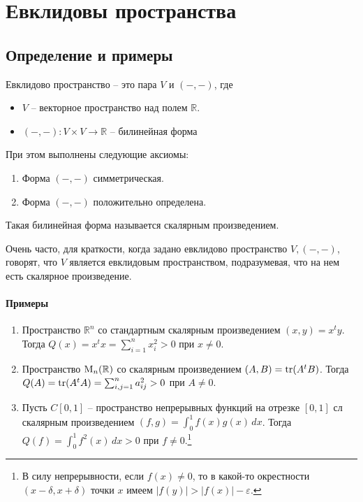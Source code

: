 \newpage
\section{Евклидовы пространства}

\subsection{Определение и примеры}

\begin{definition}
Евклидово пространство -- это пара $V$ и $({-},{-})$, где 
\begin{itemize}
\item $V$ -- векторное пространство над полем $\mathbb R$.
\item $({-},{-})\colon V\times V\to \mathbb R$ -- билинейная форма
\end{itemize}
При этом выполнены следующие аксиомы:
\begin{enumerate}
\item Форма $({-},{-})$ симметрическая.
\item Форма $({-},{-})$ положительно определена.
\end{enumerate}
Такая билинейная форма называется скалярным произведением.
\end{definition}

Очень часто, для краткости, когда задано евклидово пространство $V, ({-},{-})$, говорят, что $V$ является евклидовым пространством, подразумевая, что на нем есть скалярное произведение.

\paragraph{Примеры}
\begin{enumerate}
\item Пространство $\mathbb R^n$ со стандартным скалярным произведением $(x,y) = x^t y$. Тогда $Q(x) = x^t x = \sum_{i=1}^n x_i^2 > 0$ при $x\neq 0$.

\item Пространство $\operatorname{M}_{n}(\mathbb R)$ со скалярным произведением $(A, B) = \operatorname{tr}(A^t B)$. Тогда $Q(A) = \operatorname{tr}(A^t A) = \sum_{i,j=1}^n a_{ij}^2 > 0$ при $A\neq 0$.

\item Пусть $C[0,1]$ -- пространство непрерывных функций на отрезке $[0,1]$ сл скалярным произведением $(f,g) = \int_0^1 f(x) g(x)\,dx$. Тогда $Q(f) = \int_0^1 f^2(x)\,dx > 0$ при $f \neq 0$.\footnote{В силу непрерывности, если $f(x)\neq 0$, то в какой-то окрестности $(x-\delta, x+\delta)$ точки $x$ имеем $|f(y)| > |f(x)| - \varepsilon$. }
\end{enumerate}

